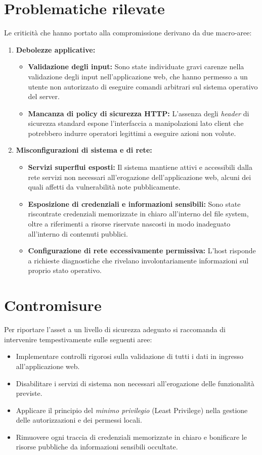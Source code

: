 \documentclass[11pt]{report}
\begin{document}
	\section{Problematiche rilevate}
	Le criticità che hanno portato alla compromissione derivano da due macro-aree:
	\begin{enumerate}
		\item \textbf{Debolezze applicative:} 
		\begin{itemize}
			\item \textbf{Validazione degli input:} Sono state individuate gravi carenze nella validazione degli input nell'applicazione web, che hanno permesso a un utente non autorizzato di eseguire comandi arbitrari sul sistema operativo del server.
			\item \textbf{Mancanza di policy di sicurezza HTTP:} L'assenza degli \textit{header} di sicurezza standard espone l'interfaccia a manipolazioni lato client che potrebbero indurre operatori legittimi a eseguire azioni non volute.
		\end{itemize}
		\item \textbf{Misconfigurazioni di sistema e di rete:}
		\begin{itemize}
			\item \textbf{Servizi superflui esposti:} Il sistema mantiene attivi e accessibili dalla rete servizi non necessari all'erogazione dell'applicazione web, alcuni dei quali affetti da vulnerabilità note pubblicamente.
			\item \textbf{Esposizione di credenziali e informazioni sensibili:} Sono state riscontrate credenziali memorizzate in chiaro all'interno del file system, oltre a riferimenti a risorse riservate nascosti in modo inadeguato all'interno di contenuti pubblici.
			\item \textbf{Configurazione di rete eccessivamente permissiva:} L'host risponde a richieste diagnostiche che rivelano involontariamente informazioni sul proprio stato operativo.
		\end{itemize}
	\end{enumerate}
	
	\section{Contromisure}
	Per riportare l'asset a un livello di sicurezza adeguato si raccomanda di intervenire tempestivamente sulle seguenti aree:
	\begin{itemize}
		\item Implementare controlli rigorosi sulla validazione di tutti i dati in ingresso all'applicazione web.
		\item Disabilitare i servizi di sistema non necessari all'erogazione delle funzionalità previste.
		\item Applicare il principio del \textit{minimo privilegio} (Least Privilege) nella gestione delle autorizzazioni e dei permessi locali.
		\item Rimuovere ogni traccia di credenziali memorizzate in chiaro e bonificare le risorse pubbliche da informazioni sensibili occultate.
	\end{itemize}
	
\end{document}
